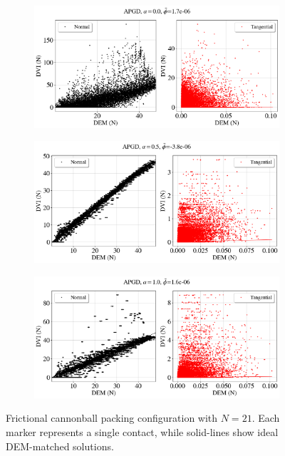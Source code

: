 \begin{itemize}
	\begin{figure}[H]
		\centering	
		\begin{subfigure}{0.9\columnwidth}	
			\centering
			\includegraphics[width=1.0\textwidth]{images/CD/Example7/18_DVI_APGD_al_0_20par.png}
		\end{subfigure}
		
		\begin{subfigure}{0.9\columnwidth}	
			\centering
			\includegraphics[width=1.0\textwidth]{images/CD/Example7/21_DVI_APGD_al_05_20par.png}
		\end{subfigure}
		
		\begin{subfigure}{0.9\columnwidth}	
			\centering
			\includegraphics[width=1.0\textwidth]{images/CD/Example7/22_DVI_APGD_al_10_20par.png}
		\end{subfigure}
		\caption{Frictional cannonball packing configuration with $N=21$. Each marker represents a single contact, while solid-lines show ideal DEM-matched solutions.  }\label{fig:cbp_N=21}
	\end{figure}
	

\end{itemize}
